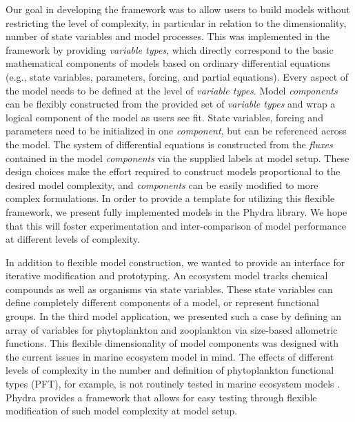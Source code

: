 \documentclass[journal abbreviation, manuscript]{copernicus}
\begin{document}
Our goal in developing the framework was to allow users to build models without restricting the level of complexity, in particular in relation to the dimensionality, number of state variables and model processes. This was implemented in the framework by providing \textit{variable types}, which directly correspond to the basic mathematical components of models based on ordinary differential equations (e.g., state variables, parameters, forcing, and partial equations). Every aspect of the model needs to be defined at the level of \textit{variable types}. Model \textit{components} can be flexibly constructed from the provided set of \textit{variable types} and wrap a logical component of the model as users see fit. State variables, forcing and parameters need to be initialized in one \textit{component}, but can be referenced across the model. The system of differential equations is constructed from the \textit{fluxes} contained in the model \textit{components} via the supplied labels at model setup. These design choices make the effort required to construct models proportional to the desired model complexity, and \textit{components} can be easily modified to more complex formulations. In order to provide a template for utilizing this flexible framework, we present fully implemented models in the Phydra library. We hope that this will foster experimentation and inter-comparison of model performance at different levels of complexity.

In addition to flexible model construction, we wanted to provide an interface for iterative modification and prototyping. An ecosystem model tracks chemical compounds as well as organisms via state variables. These state variables can define completely different components of a model, or represent functional groups. In the third model application, we presented such a case by defining an array of variables for phytoplankton and zooplankton via size-based allometric functions. This flexible dimensionality of model components was designed with the current issues in marine ecosystem model in mind. The effects of different levels of complexity in the number and definition of phytoplankton functional types (PFT), for example, is not routinely tested in marine ecosystem models \citep{Franks2009}. Phydra provides a framework that allows for easy testing through flexible modification of such model complexity at model setup. 
\end{document}
